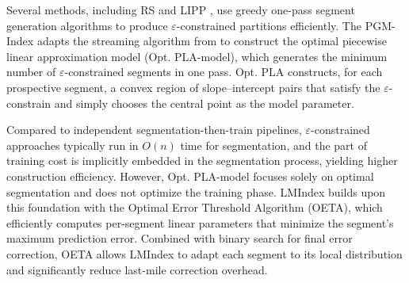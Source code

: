 Several methods, including RS \cite{radixspline20} and LIPP \cite{lipp21}, use greedy one-pass segment generation algorithms to produce $\varepsilon$-constrained partitions efficiently. The PGM-Index \cite{pgm20} adapts the streaming algorithm from \cite{line81} to construct the optimal piecewise linear approximation model (Opt. PLA-model), which generates the minimum number of $\varepsilon$-constrained segments in one pass. Opt. PLA constructs, for each prospective segment, a convex region of slope–intercept pairs that satisfy the $\varepsilon$-constrain and simply chooses the central point as the model parameter.


Compared to independent segmentation-then-train pipelines, $\varepsilon$-constrained approaches typically run in $O(n)$ time for segmentation, and the part of training cost is implicitly embedded in the segmentation process, yielding higher construction efficiency. However, Opt. PLA-model focuses solely on optimal segmentation and does not optimize the training phase. LMIndex builds upon this foundation with the Optimal Error Threshold Algorithm (OETA), which efficiently computes per-segment linear parameters that minimize the segment’s maximum prediction error. Combined with binary search for final error correction, OETA allows LMIndex to adapt each segment to its local distribution and significantly reduce last-mile correction overhead.

